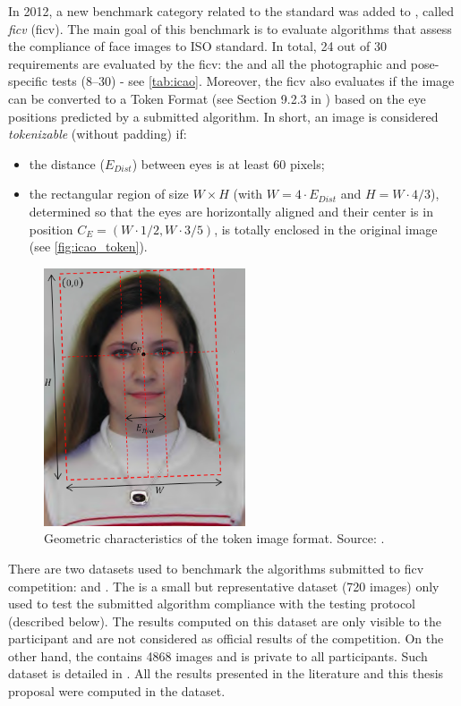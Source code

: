 In 2012, a new benchmark category related to the \icao standard was added to \fvcongoing \citep{ferrara2012face}, called \textit{\acl{ficv}} (\acs{ficv}). The main goal of this benchmark is to evaluate algorithms that assess the compliance of face images to ISO standard. In total, 24 out of 30 requirements are evaluated by the \acs{ficv}: the \eyecenterlocation and all the photographic and pose-specific tests (8--30) - see \autoref{tab:icao}. Moreover, the \acs{ficv} also evaluates if the image can be converted to a Token Format (see Section 9.2.3 in \citep{iso-iec}) based on the eye positions predicted by a submitted algorithm. In short, an image is considered \textit{tokenizable} (without padding) if:

\begin{itemize}
\item the distance ($E_{Dist}$) between eyes is at least 60 pixels;
\item the rectangular region of size $W \times H$ (with $W=4\cdot E_{Dist}$ and $H=W \cdot 4/3$), determined so that the eyes are horizontally aligned and their center is in position $C_E=(W\cdot1/2,W\cdot3/5)$, is totally enclosed in the original image (see \autoref{fig:icao_token}).
\end{itemize}

\begin{figure}[ht]
    \centering
    \includegraphics[height=3.0in]{images/icao_tokenizable.png}
    \caption{Geometric characteristics of the token image format. Source: \citep{fvcongoing}.}
    \label{fig:icao_token}
\end{figure}

There are two datasets used to benchmark the algorithms submitted to \acs{ficv} competition: \ficvtest and \ficvofficial. The \ficvtest is a small but representative dataset (720 images) only used to test the submitted algorithm compliance with the testing protocol (described below). The results computed on this dataset are only visible to the participant and are not considered as official results of the competition. On the other hand, the \ficvofficial contains 4868 images and is private to all participants. Such dataset is detailed in \cite{ferrara2012face}. All the results presented in the literature and this thesis proposal were computed in the \ficvofficial dataset.

